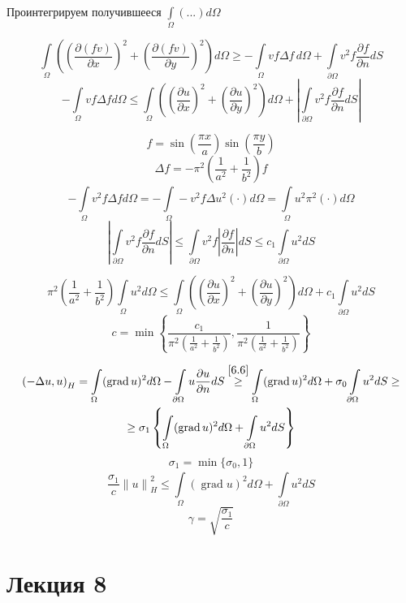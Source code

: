 \documentclass[12pt, a4paper]{article}
\newcommand{\Int}{\int\limits}
\begin{document}
Проинтегрируем получившееся $\Int_{\Omega} (...) d\Omega$

\[ \Int_{\Omega}^{} \left( {\left( \frac{\partial (fv)}{\partial x}\right)}^2 + {\left(\frac{\partial (fv)}{\partial y}\right)}^2 \right) d\Omega \geq - \Int_{\Omega}^{}vf\Delta f \, d\Omega + \Int_{\partial \Omega}^{}v^2 f \frac{\partial f}{\partial  n} dS \]
\[ -\Int_{\Omega}^{} vf \Delta f d\Omega \leq \Int_{\Omega} \left( {\left(\frac{\partial u }{\partial x}\right)}^2 + {\left(\frac{\partial u }{\partial y}\right)}^2 \right) d\Omega + \left| \Int_{\partial \Omega}^{} v^2 f \frac{\partial f}{\partial n}d S \right| \]

\[ f = \sin \left(\frac{\pi x}{a}\right) \sin \left(\frac{\pi y }{b}\right) \]
\[ \Delta f = - \pi^2 \left(\frac{1}{a^2} + \frac{1}{b^2}\right) f \]
\[ -\Int_{\Omega}^{}v^2 f \Delta f d\Omega = -\Int_{\Omega}^{} -v^2 f \Delta u^2 (\cdot) d\Omega = \Int_{\Omega}^{} u^2 \pi^2 (\cdot) d\Omega \]
\[ \left| \Int_{\partial \Omega}^{}v^2 f \frac{\partial f}{\partial n} dS \right| \leq \Int_{\partial  \Omega}^{} v^2 f \left| \frac{\partial f}{\partial n} \right| dS \leq c_1 \Int_{\partial \Omega}^{} u^2 dS \]

\[ \pi^2 \left(\frac{1}{a^2} + \frac{1}{b^2}\right) \Int_{\Omega}^{} u^2 d\Omega \leq \Int_{\Omega} \left( {\left(\frac{\partial u }{\partial x}\right)}^2 + {\left(\frac{\partial u }{\partial y}\right)}^2 \right) d\Omega + c_1 \Int_{\partial \Omega}^{} u^2 dS \]
\[ c = \min \left\{ \frac{c_1}{\pi^2 \left( \frac{1}{a^2} + \frac{1}{b^2}\right)}, \frac{1}{\pi^2 \left( \frac{1}{a^2} + \frac{1}{b^2}\right)} \right\} \]

\begin{multline*}
	{(-\Delta u, u)}_H = \Int_{\Omega}^{} (\operatorname{grad} u)^2 d\Omega - \Int_{\partial \Omega}^{}u \frac{\partial u}{\partial n} dS \overset{\eqref{6.6}}{\geq} \Int_{\Omega}^{} (\operatorname{grad} u)^2 d\Omega + \sigma_0 \Int_{\partial  \Omega}^{} u^2 dS \geq \\
	\geq \sigma_1 \left\{ \Int_{\Omega}^{} (\operatorname{grad} u)^2 d\Omega + \Int_{\partial \Omega}^{}u^2 dS \right\}
\end{multline*}
\[ \sigma_1 = \min \{\sigma_0, 1\} \]
\[ \frac{\sigma_1}{c} {\|u\|}_H^2 \leq \Int_{\Omega}^{} (\operatorname{grad} u)^2 d\Omega + \Int_{\partial \Omega}^{}u^2 dS \]
\[ \gamma = \sqrt{\frac{\sigma_1}{c}} \]

\newpage

\section{Лекция 8}
\end{document}
